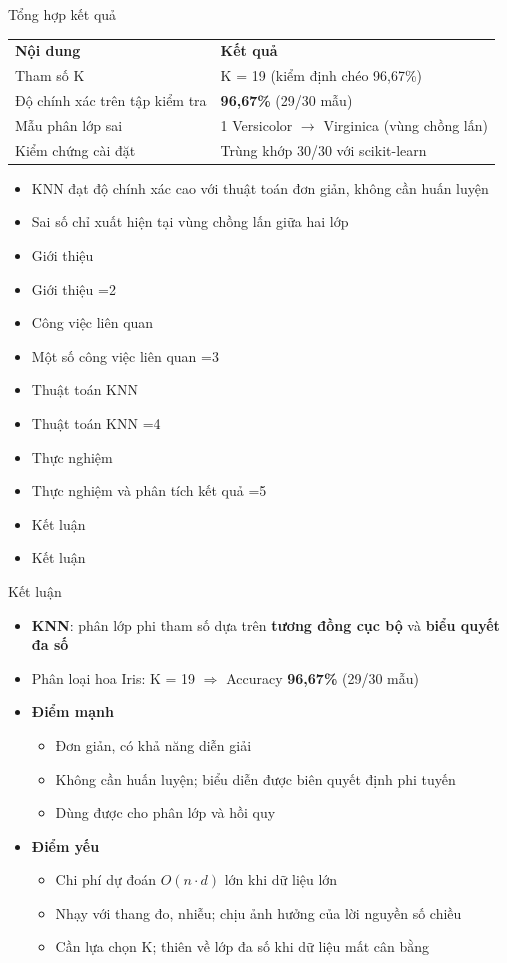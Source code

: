 \documentclass[aspectratio=169,10pt]{beamer}
\newcommand{\hl}[1]{\textcolor{nhan}{\textbf{#1}}}
\newcommand{\hx}[1]{\textcolor{xanh}{\textbf{#1}}}
\newcommand{\mucluc}[1]{%
  \begin{frame}[plain]
    \vspace*{1.6cm}
    \begin{itemize}\setlength\itemsep{0.5em}
      \ifnum#1=1 \item {\Huge Giới thiệu}\else \item {\large Giới thiệu}\fi
      \ifnum#1=2 \item {\Huge Công việc liên quan}\else \item {\large Một số công việc liên quan}\fi
      \ifnum#1=3 \item {\Huge Thuật toán KNN}\else \item {\large Thuật toán KNN}\fi
      \ifnum#1=4 \item {\Huge Thực nghiệm}\else \item {\large Thực nghiệm và phân tích kết quả}\fi
      \ifnum#1=5 \item {\Huge Kết luận}\else \item {\large Kết luận}\fi
    \end{itemize}
  \end{frame}}
\begin{document}
\begin{frame}{Tổng hợp kết quả}
\centering\small
\renewcommand{\arraystretch}{1.6}
\begin{tabular}{ll}
\rowcolor{bang}\textbf{Nội dung} & \textbf{Kết quả}\\
Tham số K & K = 19 (kiểm định chéo 96,67\%)\\
Độ chính xác trên tập kiểm tra & \hx{96,67\%} (29/30 mẫu)\\
Mẫu phân lớp sai & 1 Versicolor $\to$ Virginica (vùng chồng lấn)\\
Kiểm chứng cài đặt & Trùng khớp 30/30 với scikit-learn\\
\end{tabular}
\vspace{0.6em}
\begin{itemize}
  \item KNN đạt độ chính xác cao với thuật toán đơn giản, không cần huấn luyện
  \item Sai số chỉ xuất hiện tại vùng chồng lấn giữa hai lớp
\end{itemize}
\end{frame}

\mucluc{5}

\begin{frame}{Kết luận}
\begin{itemize}\setlength\itemsep{0.45em}
  \item \textbf{KNN}: phân lớp phi tham số dựa trên \hl{tương đồng cục bộ} và \hl{biểu quyết đa số}
  \item Phân loại hoa Iris: K = 19 $\Rightarrow$ Accuracy \hx{96,67\%} (29/30 mẫu)
  \item \textbf{Điểm mạnh}
  \begin{itemize}
    \item Đơn giản, có khả năng diễn giải
    \item Không cần huấn luyện; biểu diễn được biên quyết định phi tuyến
    \item Dùng được cho phân lớp và hồi quy
  \end{itemize}
  \item \textbf{Điểm yếu}
  \begin{itemize}
    \item Chi phí dự đoán $O(n\cdot d)$ lớn khi dữ liệu lớn
    \item Nhạy với thang đo, nhiễu; chịu ảnh hưởng của lời nguyền số chiều
    \item Cần lựa chọn K; thiên về lớp đa số khi dữ liệu mất cân bằng
  \end{itemize}
\end{itemize}
\end{frame}
\end{document}
